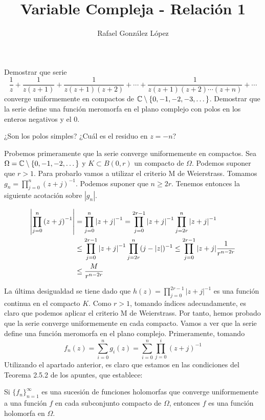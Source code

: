 \documentclass[twoside]{article}
\begin{document}
\title{Variable Compleja - Relación 1}
\author{Rafael González López}
\maketitle

\begin{ejercicio}{1}
Demostrar que serie 
$$
\frac{1}{z}+\frac{1}{z(z+1)}+\frac{1}{z(z+1)(z+2)}+\cdots + \frac{1}{z(z+1)(z+2)\cdots  (z+n)}+\cdots$$
converge uniformemente en compactos de $\mathbb{C}\setminus\{0,-1,-2,-3,\dotsc\}$. Demostrar que la serie define una función meromorfa en el plano complejo con polos en los enteros negativos y el $0$.

¿Son los polos simples? ¿Cuál es el residuo en $z=-n$?
\begin{solucion}
Probemos primeramente que la serie converge uniformemente en compactos. Sea $\Omega = \mathbb{C}\setminus\{0,-1,-2,\dotsc\}$ y $K\subset B(0,r)$ un compacto de $\Omega$. Podemos suponer que $r>1$. Para probarlo vamos a utilizar el criterio M de Weierstrass. Tomamos $g_n = \prod_{j=0}^n \left(z+j\right)^{-1}$. Podemos suponer que $n\geq 2r$.  Tenemos entonces la siguiente acotación sobre $|g_n|$.

\begin{align*}
\left\lvert\prod_{j=0}^n \left(z+j\right)^{-1}\right\rvert &= \prod_{j=0}^n \left|z+j\right|^{-1} =  \prod_{j=0}^{2r-1}\left|z+j\right|^{-1}  \prod_{j=2r}^n \left|z+j\right|^{-1}\\
&\leq  \prod_{j=0}^{2r-1}\left|z+j\right|^{-1}  \prod_{j=2r}^n (j-|z|)^{-1} \leq \prod_{j=0}^{2r-1}|z+j|\frac{1}{r^{n-2r}}\\
& \leq \frac{M}{r^{n-2r}}
\end{align*}

La última desigualdad se tiene dado que $h(z)=\prod_{j=0}^{2r-1}|z+j|^{-1}$ es una función continua en el compacto $K$. Como $r>1$, tomando índices adecuadamente, es claro que podemos aplicar el criterio M de Weierstrass. Por tanto, hemos probado que la serie converge uniformemente en cada compacto.
\newpage
Vamos a ver que la serie define una función meromorfa en el plano complejo. Primeramente, tomando 
$$
 f_n(z) = \sum_{i=0}^n g_i(z) = \sum_{i=0}^n \prod_{j=0}^i (z+j)^{-1}
$$
Utilizando el apartado anterior, es claro que estamos en las condiciones del Teorema 2.5.2 de los apuntes, que establece:

\begin{theorem}
Si $\{f_n\}_{n=1}^\infty$ es una sucesión de funciones holomorfas que converge uniformemente a una función $f$ en cada subconjunto compacto de $\Omega$, entonces $f$ es una función holomorfa en $\Omega$.
\end{theorem}


\end{solucion}
\end{ejercicio}
\end{document}
